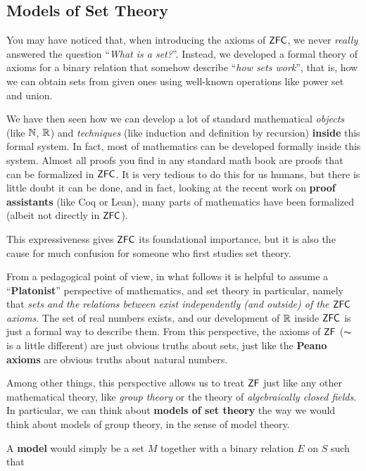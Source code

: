 \subsection{Models of Set Theory}

You may have noticed that, when introducing the axioms of $\mathsf{ZFC}$, we never \textit{really} answered the question ``\textit{What is a set?}''. Instead, we developed a formal theory of axioms for a binary relation that somehow describe ``\textit{how sets work}'', that is, how we can obtain sets from given ones using well-known operations like power set and union.

We have then seen how we can develop a lot of standard mathematical \textit{objects} (like $\mathbb{N}$, $\mathbb{R}$) and \textit{techniques} (like induction and definition by recursion) \textbf{inside} this formal system. In fact, most of mathematics can be developed formally inside this system. Almost all proofs you find in any standard math book are proofs that can be formalized in $\mathsf{ZFC}$. It is very tedious to do this for us humans, but there is little doubt it can be done, and in fact, looking at the recent work on \textbf{proof assistants} (like Coq or Lean), many parts of mathematics have been formalized (albeit not directly in $\mathsf{ZFC}$).

This expressiveness gives $\mathsf{ZFC}$ its foundational importance, but it is also the cause for much confusion for someone who first studies set theory.

From a pedagogical point of view, in what follows it is helpful to assume a ``\textbf{Platonist}'' perspective of mathematics, and set theory in particular, namely that \textit{sets and the relations between exist independently (and outside) of the $\mathsf{ZFC}$ axioms}. The set of real numbers exists, and our development of $\mathbb{R}$ inside $\mathsf{ZFC}$ is just a formal way to describe them. From this perspective, the axioms of $\mathsf{ZF}$ ($\AC$ is a little different) are just obvious truths about sets, just like the \textbf{Peano axioms} are obvious truths about natural numbers.

Among other things, this perspective allows us to treat $\mathsf{ZF}$ just like any other mathematical theory, like \textit{group theory} or the theory of \textit{algebraically closed fields}.
In particular, we can think about \textbf{models of set theory} the way we would think about models of group theory, in the sense of model theory.

A \textbf{model} would simply be a set $M$ together with a binary relation $E$ on $S$ such that

